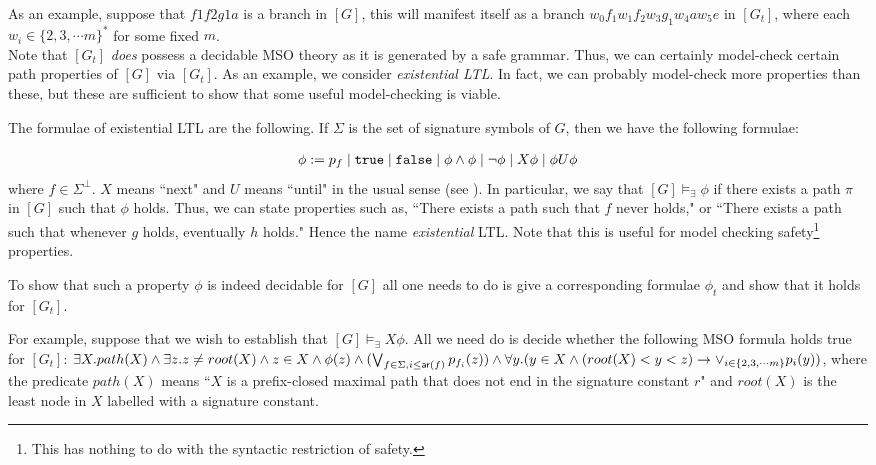 
As an example, suppose that $f1f2g1a$ is a branch in $[G]$, this
will manifest itself as a branch $w_0f_1w_1f_2w_3g_1w_4aw_5e$ in
$[G_t]$, where each $w_i \in \{2, 3, \cdots m\}^*$ for some fixed
$m$. \\

Note that $[G_t]$ \emph{does} possess a decidable MSO theory as it
is generated by a safe grammar. Thus, we can certainly model-check
certain path properties of $[G]$ via $[G_t]$. As an example, we
consider \emph{existential LTL}. In fact, we can probably
model-check more properties than these, but these are sufficient
to show that some useful model-checking is viable.

The formulae of existential LTL are the following. If $\Sigma$ is
the set of signature symbols of $G$, then we have the following
formulae:

\begin{eqnarray}
\nonumber \phi := p_f \; | \; {\tt true} \; | \; {\tt false} \; |
\; \phi \wedge \phi \; | \; \neg \phi \; | \; X \phi \; | \; \phi
U \phi
\end{eqnarray}
where $f \in \Sigma^\bot$. $X$ means ``next" and $U$ means ``until" in
the usual sense (see \cite{Var95}). In particular, we say that
$[G] \models_{\exists} \phi$ if there exists a path $\pi$ in $[G]$
such that $\phi$ holds. Thus, we can state properties such as,
``There exists a path such that $f$ never holds," or ``There
exists a path such that whenever $g$ holds, eventually $h$ holds."
Hence the name \emph{existential} LTL. Note that this is useful
for model checking safety\footnote{This has nothing to do with the
syntactic restriction of safety.} properties.

To show that such a property $\phi$ is indeed decidable for $[G]$
all one needs to do is give a corresponding formulae $\phi_t$ and
show that it holds for $[G_t]$.

For example, suppose that we wish to establish that $[G]
\models_{\exists} X \phi$. All we need do is decide whether the
following MSO formula holds true for $[G_t]$: $\exists X. path(X)
\wedge \exists z . z \not = root(X) \wedge z \in X \wedge \phi(z)
\wedge (\bigvee_{f \in \Sigma, i \leq {\sf ar}(f)} p_{f_i}(z))
\wedge \forall y . (y \in X \wedge (root(X) <y < z) \rightarrow
\vee_{i \in \{2, 3, \cdots m\}} p_i(y))$, where the predicate
$path(X)$ means ``$X$ is a prefix-closed maximal path that does
not end in the signature constant $r$" and $root(X)$ is the least
node in $X$ labelled with a signature constant.


